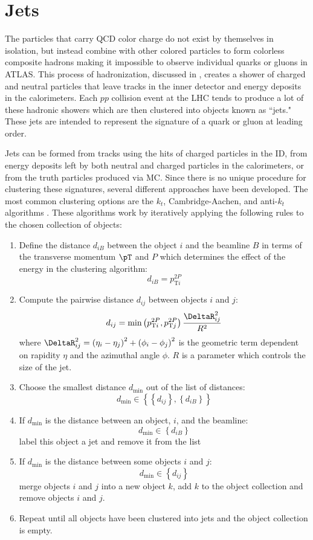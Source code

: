 \section{Jets} \label{sec:objects:jets}

The particles that carry QCD color charge do not exist by themselves in
isolation, but instead combine with other colored particles to form colorless
composite hadrons making it impossible to observe individual quarks or gluons
in ATLAS. This process of hadronization, discussed in ,
creates a shower of charged and neutral particles that leave tracks in the
inner detector and energy deposits in the calorimeters.  Each $pp$ collision
event at the LHC tends to produce a lot of these hadronic showers which are
then clustered into objects known as ``jets."  These jets are intended to
represent the signature of a quark or gluon at leading order.

Jets can be formed from tracks using the hits of charged particles in the ID,
from energy deposits left by both neutral and charged particles in the
calorimeters, or from the truth particles produced via MC.  Since there is
no unique procedure for clustering these signatures, several different
approaches have been developed. The most common clustering options are the
$k_{t}$, Cambridge-Aachen, and anti-$k_{t}$ algorithms \cite{Cacciari:2008gp}.
These algorithms work by iteratively applying the following rules to the
chosen collection of objects:

\begin{enumerate}
  \item Define the distance $d_{iB}$ between the object $i$ and the beamline $B$ in terms of the transverse momentum $\pT$ and $P$ which determines the effect of the energy in the clustering algorithm: \[ d_{iB} = p_{\text{T}i}^{2P} \]
  \item Compute the pairwise distance $d_{ij}$ between objects $i$ and $j$: \[ d_{ij} = \textrm{min}\left(p_{\text{T}i}^{2P}, p_{\text{T}j}^{2P}\right) \frac{\DeltaR_{ij}^{2}}{R^{2}} \] where $\DeltaR_{ij}^{2} = \left(\eta_{i} - \eta_{j}\right)^{2} + \left(\phi_{i} - \phi_{j}\right)^{2}$ is the geometric term dependent on rapidity $\eta$ and the azimuthal angle $\phi$.  $R$ is a parameter which controls the size of the jet.
  \item Choose the smallest distance $d_{\text{min}}$ out of the list of distances: \[ d_{\mathrm{min}} \in \left\{\left\{d_{ij}\right\},\left\{d_{iB}\right\}\right\} \] 
  \item If $d_{\text{min}}$ is the distance between an object, $i$, and the beamline: \[ d_{\mathrm{min}} \in \left\{d_{iB}\right\} \] label this object a jet and remove it from the list
  \item If $d_{\text{min}}$ is the distance between some objects $i$ and $j$: \[ d_{\mathrm{min}} \in \left\{d_{ij}\right\} \] merge objects $i$ and $j$ into a new object $k$, add $k$ to the object collection and remove objects $i$ and $j$.
  \item Repeat until all objects have been clustered into jets and the object collection is empty.
\end{enumerate}

